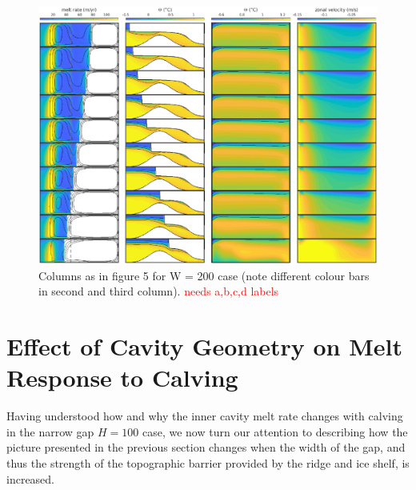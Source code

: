 \documentclass[draft]{agujournal2019}
\newcommand{\red}[1]{\textcolor{red}{#1}}
\begin{document}
\begin{figure}
    \centering
    \includegraphics[width = \textwidth]{../make_figures/plots/figure7.eps}
    \caption{Columns as in figure 5 for W = 200 case (note different colour bars in second and third column). \red{needs a,b,c,d labels}}
    \label{fig:figure7}
\end{figure}



\section{Effect of Cavity Geometry on Melt Response to Calving}\label{S:Results:H}
Having understood how and why the inner cavity melt rate changes with calving in the narrow gap $H = 100$ case, we now turn our attention to describing how the picture presented in the previous section changes when the width of the gap, and thus the strength of the topographic barrier provided by the ridge and ice shelf, is increased.
\end{document}
